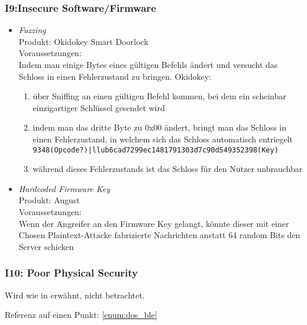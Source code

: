     \subsubsection*{I9:Insecure Software/Firmware}
        \begin{itemize}[leftmargin=0cm,label={}]
            \item \emph{Fuzzing}\cite{Rose2016}\\
                Produkt: Okidokey Smart Doorlock\\
                Voraussetzungen: \\  
                Indem man einige Bytes eines gültigen Befehls ändert und versucht das Schloss in einen Fehlerzustand zu bringen. 
    	        Okidokey:
    	        \begin{enumerate}[noitemsep]
    	            \item über Sniffing an einen gültigen Befehl kommen, bei dem ein scheinbar einzigartiger Schlüssel gesendet wird
    	            \item indem man das dritte Byte zu 0x00 ändert, bringt man das Schloss in einen Fehlerzustand, in welchem sich das Schloss automatisch entriegelt\\
    	            \lstinline{9348(Opcode?)|llub6cad7299ec1481791303d7c90d549352398(Key)}
    	            \item während dieses Fehlerzustands ist das Schloss für den Nutzer unbrauchbar
    	        \end{enumerate} 
	        \item \emph{Hardcoded Firmware Key}\cite{Fuller2017}\\
                Produkt: August\\
                Voraussetzungen: \\
                Wenn der Angreifer an den Firmware Key gelangt, könnte dieser mit einer Chosen Plaintext-Attacke fabrizierte Nachrichten anstatt 64 random Bits den Server schicken
        \end{itemize}
        
    \subsubsection*{I10: Poor Physical Security}
        Wird wie in  erwähnt, nicht betrachtet.
    
    Referenz auf einen Punkt: \ref{enum:dos_ble}
    